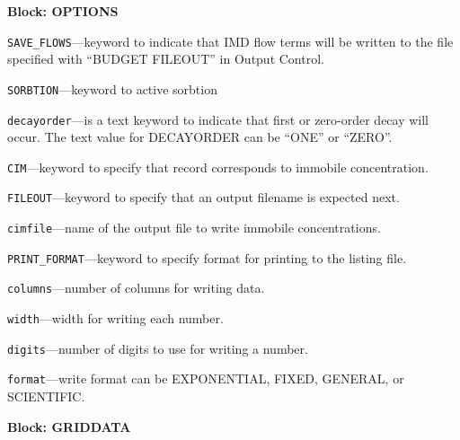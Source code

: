 
\item \textbf{Block: OPTIONS}

\begin{description}
\item \texttt{SAVE\_FLOWS}---keyword to indicate that IMD flow terms will be written to the file specified with ``BUDGET FILEOUT'' in Output Control.

\item \texttt{SORBTION}---keyword to active sorbtion

\item \texttt{decayorder}---is a text keyword to indicate that first or zero-order decay will occur.  The text value for DECAYORDER can be ``ONE'' or ``ZERO''.

\item \texttt{CIM}---keyword to specify that record corresponds to immobile concentration.

\item \texttt{FILEOUT}---keyword to specify that an output filename is expected next.

\item \texttt{cimfile}---name of the output file to write immobile concentrations.

\item \texttt{PRINT\_FORMAT}---keyword to specify format for printing to the listing file.

\item \texttt{columns}---number of columns for writing data.

\item \texttt{width}---width for writing each number.

\item \texttt{digits}---number of digits to use for writing a number.

\item \texttt{format}---write format can be EXPONENTIAL, FIXED, GENERAL, or SCIENTIFIC.

\end{description}
\item \textbf{Block: GRIDDATA}

